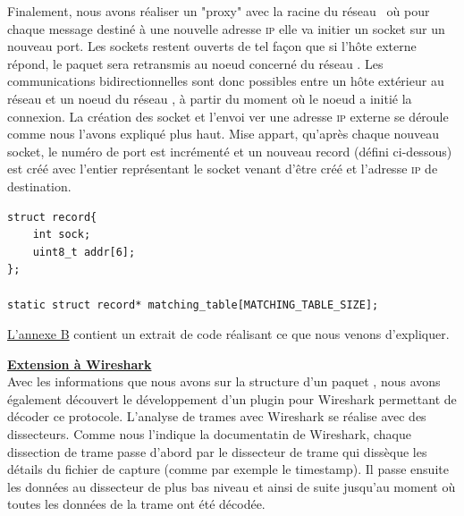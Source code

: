             Finalement, nous avons réaliser un "proxy" avec la racine du réseau \espmesh\ où pour chaque
            message destiné à une nouvelle adresse \textsc{ip} elle va initier un socket sur un nouveau port.
            Les sockets restent ouverts de tel façon que si l'hôte externe répond, le paquet sera retransmis au
            noeud concerné du réseau \espmesh. Les communications bidirectionnelles sont donc possibles entre
            un hôte extérieur au réseau et un noeud du réseau \espmesh, à partir du moment où le noeud a initié
            la connexion. La création des socket et l'envoi ver une adresse \textsc{ip} externe se déroule comme nous l'avons expliqué plus
            haut. Mise appart, qu'après chaque nouveau socket, le numéro de port est incrémenté et un nouveau record (défini ci-dessous)
            est créé avec l'entier représentant le socket venant d'être créé et l'adresse \textsc{ip} de destination.
            \begin{verbatim}
struct record{
    int sock;
    uint8_t addr[6];
};

static struct record* matching_table[MATCHING_TABLE_SIZE];
            \end{verbatim}
\hyperref[annexeB]{L'annexe B} contient un extrait de code réalisant ce que nous venons d'expliquer.
        
        \textbf{\underline{Extension à Wireshark}}\\
        Avec les informations que nous avons sur la structure d'un paquet \espmesh, nous avons également découvert le développement
        d'un plugin pour Wireshark permettant de décoder ce protocole.
        L'analyse de trames avec Wireshark se réalise avec des dissecteurs. Comme nous l'indique la documentatin de Wireshark\cite{wireshark_doc},
        chaque dissection de trame passe d'abord par le dissecteur de trame qui dissèque les détails du fichier de capture
        (comme par exemple le timestamp). Il passe ensuite les données au dissecteur de plus bas niveau et ainsi de suite jusqu'au moment
        où toutes les données de la trame ont été décodée.

